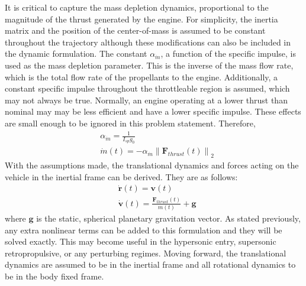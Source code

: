 \documentclass[conf]{new-aiaa}
\begin{document}
It is critical to capture the mass depletion dynamics, proportional to the magnitude of the thrust generated by the engine. For simplicity, the inertia matrix and the position of the center-of-mass is assumed to be constant throughout the trajectory although these modifications can also be included in the dynamic formulation. The constant $\alpha_{\dot{m}}$, a function of the specific impulse, is used as the mass depletion parameter. This is the inverse of the mass flow rate, which is the total flow rate of the propellants to the engine. Additionally, a constant specific impulse throughout the throttleable region is assumed, which may not always be true. Normally, an engine operating at a lower thrust than nominal may may be less efficient and have a lower specific impulse. These effects are small enough to be ignored in this problem statement. Therefore,
% 
\begin{align}
& \alpha_{\dot{m}} = \frac{1}{I_{sp} g_0} \\
& \dot{m}(t) = -\alpha_{\dot{m}} \left\lVert \mathbf{F}_{thrust}(t) \right\rVert _2
\end{align}
% 
With the assumptions made, the translational dynamics and forces acting on the vehicle in the inertial frame can be derived. They are as follows:
% 
\begin{align}
& \dot{\mathbf{r}}(t) = \mathbf{v}(t) \\
& \dot{\mathbf{v}}(t) = \frac{\mathbf{F}_{thrust}(t)}{m(t)} + \mathbf{g}
\end{align}
where $\mathbf{g}$ is the static, spherical planetary gravitation vector. As stated previously, any extra nonlinear terms can be added to this formulation and they will be solved exactly. This may become useful in the hypersonic entry, supersonic retropropulsive, or any perturbing regimes. Moving forward, the translational dynamics are assumed to be in the inertial frame and all rotational dynamics to be in the body fixed frame.
\end{document}
